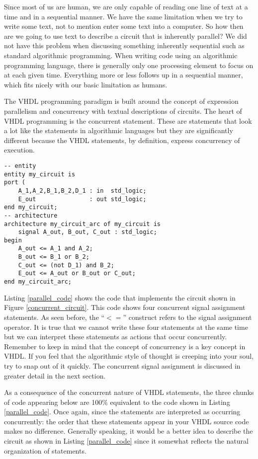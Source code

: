 Since most of us are human, we are only capable of reading one line of text at a time and in a sequential manner. We have the same limitation when we try to write some text, not to mention enter some text into a computer. So how then are we going to use text to describe a circuit that is inherently parallel? We did not have this problem when discussing something inherently sequential such as standard algorithmic programming. When writing code using an algorithmic programming language, there is generally only one processing element to focus on at each given time. Everything more or less follows up in a sequential manner, which fits nicely with our basic limitation as humans. 

The VHDL programming paradigm is built around the concept of expression parallelism and concurrency with textual descriptions of circuits. The heart of VHDL programming is the concurrent statement. These are statements that look a lot like the statements in algorithmic languages but they are significantly different because the VHDL statements, by definition, express concurrency of execution.
 
\begin{lstlisting}[label=parallel_code, caption=VHDL code for the circuit of Figure 4.1.]
-- entity
entity my_circuit is
port ( 
	A_1,A_2,B_1,B_2,D_1	: in  std_logic;
	E_out				: out std_logic;
end my_circuit;
-- architecture
architecture my_circuit_arc of my_circuit is
	signal A_out, B_out, C_out : std_logic;
begin
	A_out <= A_1 and A_2;   
	B_out <= B_1 or B_2; 
	C_out <= (not D_1) and B_2; 
	E_out <= A_out or B_out or C_out;
end my_circuit_arc;
\end{lstlisting}

Listing \ref{parallel_code} shows the code that implements the circuit shown in Figure \ref{concurrent_circuit}. This code shows four concurrent signal assignment statements. As seen before, the ``$<=$'' construct refers to the signal assignment operator. It is true that we cannot write these four statements at the same time but we can interpret these statements as actions that occur concurrently. Remember to keep in mind that the concept of concurrency is a key concept in VHDL. If you feel that the algorithmic style of thought is creeping into your soul, try to snap out of it quickly. The concurrent signal assignment is discussed in greater detail in the next section. 

As a consequence of the concurrent nature of VHDL statements, the three chunks of code appearing below are 100\% equivalent to the code shown in Listing \ref{parallel_code}. Once again, since the statements are interpreted as occurring concurrently: the order that these statements appear in your VHDL source code makes no difference. Generally speaking, it would be a better idea to describe the circuit as shown in Listing \ref{parallel_code} since it somewhat reflects the natural organization of statements.

